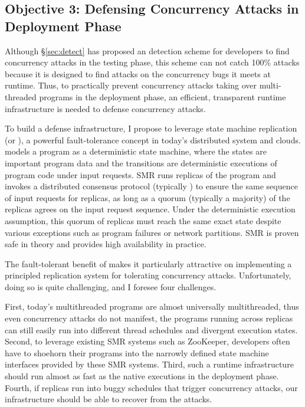 \vspace{-.15in}\subsection{Objective 3: Defensing Concurrency Attacks in 
Deployment Phase} 
\label{sec:defense}\vspace{-.075in}

Although \S\ref{sec:detect} has proposed an detection scheme for developers to 
find concurrency attacks in the testing phase, this scheme can not catch 100\% 
attacks because it is designed to find attacks on the concurrency bugs it meets 
at runtime. Thus, to practically prevent concurrency attacks taking over 
multi-threaded programs in the deployment phase, an efficient, transparent 
runtime infrastructure is needed to defense concurrency attacks.

To build a defense infrastructure, I propose to leverage state machine 
replication (or \smr), a powerful fault-tolerance concept in today's 
distributed system and clouds. \smr models a program as a deterministic
state machine, where the states are important program data and the transitions 
are deterministic executions of program code under input requests. SMR runs 
replicas of the program and invokes a distributed consensus protocol 
(typically \paxos) to ensure the same sequence of input requests for replicas, 
as long as a quorum (typically a majority) of the replicas agrees on the input 
request sequence. Under the deterministic execution assumption, this quorum of 
replicas must reach the same exact state despite various exceptions such as 
program failures or network partitions. SMR is proven safe in theory and 
provides high availability in practice.

The fault-tolerant benefit of \smr makes it particularly attractive
on implementing a principled replication system for tolerating concurrency 
attacks. Unfortunately, doing so is quite challenging, and I foresee four 
challenges.

First, today's multithreaded programs are almost universally
multithreaded, thus even concurrency attacks do not manifest, the programs 
running across replicas can still easily run into different thread schedules 
and divergent execution states. Second, to leverage existing SMR systems such 
as ZooKeeper, developers often have to shoehorn their programs into the 
narrowly defined state machine interfaces provided by these SMR systems. Third, 
such a runtime infrastructure should run almost as fast as the native 
executions in the deployment phase. Fourth, if replicas run into buggy 
schedules that trigger concurrency attacks, our infrastructure should be able 
to recover from the attacks.

